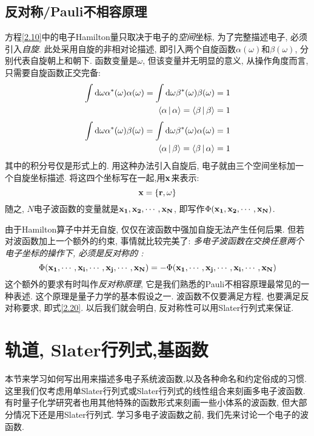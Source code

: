 \subsection{反对称/Pauli不相容原理}
\label{sec2.1.3}
方程\ref{2.10}中的电子Hamilton量只取决于电子的\emph{空间}坐标, 为了完整描述电子, 必须引入\emph{自旋}. 此处采用自旋的非相对论描述, 即引入两个自旋函数$\alpha(\omega)$和$\beta(\omega)$, 分别代表自旋朝上和朝下. 函数变量是$\omega$, 但该变量并无明显的意义, 从操作角度而言, 只需要自旋函数正交完备:
\begin{subequations}
	\begin{align}
\int\dd\omega\alpha^*(\omega)\alpha(\omega)=\int\dd\omega\beta^*(\omega)\beta(\omega)=1\\
\braket{\alpha|\alpha}=\braket{\beta|\beta}=1
	\end{align}
\end{subequations}
\begin{subequations}
	\begin{align}
	\int\dd\omega\alpha^*(\omega)\beta(\omega)=\int\dd\omega\beta^*(\omega)\alpha(\omega)=1\\
	\braket{\alpha|\beta}=\braket{\beta|\alpha}=1
	\end{align}
\end{subequations}
 其中的积分号仅是形式上的. 用这种办法引入自旋后, 电子就由三个空间坐标加一个自旋坐标描述. 将这四个坐标写在一起,用$\mathbf{x}$来表示:
 \begin{equation}
 \label{2.21}
 \mathbf{x}=\{\mathbf{r},\omega\}
 \end{equation}
 随之, $N$电子波函数的变量就是$ \mathbf{x_1,x_2,\cdots ,x_N} $, 即写作$\Phi(\mathbf{x_1,x_2,\cdots ,x_N})$.
 
 由于Hamilton算子中并无自旋, 仅仅在波函数中强加自旋无法产生任何后果. 但若对波函数加上一个额外的约束, 事情就比较完美了: \emph{多电子波函数在交换任意两个电子坐标的操作下, 必须是反对称的
 :}
\begin{equation}
\label{2.20}
\Phi(\mathbf{x_1,\cdots,x_i,\cdots,x_j,\cdots ,x_N})=-\Phi(\mathbf{x_1,\cdots,x_j,\cdots,x_i,\cdots ,x_N})
\end{equation}
 这个额外的要求有时叫作\emph{反对称原理}, 它是我们熟悉的Pauli不相容原理最常见的一种表述. 这个原理是量子力学的基本假设之一. 波函数不仅要满足\sch 方程, 也要满足反对称要求, 即式\ref{2.20}. 以后我们就会明白, 反对称性可以用Slater行列式来保证.
 
\section{轨道, Slater行列式,基函数}
\label{sec2.2}
 本节来学习如何写出用来描述多电子系统波函数,以及各种命名和约定俗成的习惯. 这里我们仅考虑用单Slater行列式或Slater行列式的线性组合来刻画多电子波函数. 有时量子化学研究者也用其他特殊的函数形式来刻画一些小体系的波函数, 但大部分情况下还是用Slater行列式. 学习多电子波函数之前, 我们先来讨论一个电子的波函数.
 

